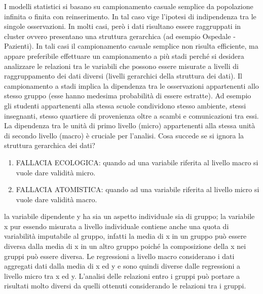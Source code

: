 \documentclass[a4page, 11pt]{article}
\begin{document}
I modelli statistici si basano su campionamento casuale semplice da popolazione infinita o finita con reinserimento. In tal caso vige l’ipotesi di indipendenza tra le singole osservazioni.
\newline 
In molti casi, però i dati risultano essere raggruppati in cluster ovvero presentano una struttura gerarchica (ad esempio Ospedale - Pazienti). In tali casi il campionamento casuale semplice non risulta efficiente, ma appare preferibile effettuare un campionamento a più stadi perché si desidera analizzare le relazioni tra le variabili che possono essere misurate a livelli di raggruppamento dei dati diversi (livelli gerarchici della struttura dei dati).
\newline
Il campionamento a stadi implica la dipendenza tra le osservazioni appartenenti allo stesso gruppo (esse hanno medesima probabilità di essere estratte).
\newline
Ad esempio gli studenti appartenenti alla stessa scuole condividono stesso ambiente, stessi insegnanti, stesso quartiere di provenienza oltre a scambi e comunicazioni tra essi.
\newline
La dipendenza tra le unità di primo livello (micro) appartenenti alla stessa unità di secondo livello (macro) è cruciale per l’analisi.
\newline
\newline
Cosa succede se si ignora la struttura gerarchica dei dati?
\begin{enumerate}[noitemsep]
\item FALLACIA ECOLOGICA: quando ad una variabile riferita al livello macro si vuole dare validità micro.
\item FALLACIA ATOMISTICA: quando ad una variabile riferita al livello micro si vuole dare validità macro.
\end{enumerate}
la variabile dipendente y ha sia un aspetto individuale sia di gruppo; la variabile x pur essendo misurata a livello individuale contiene anche una quota di variabilità imputabile al gruppo, infatti la media di x in un gruppo può essere diversa dalla media di x in un altro gruppo poiché la composizione della x nei gruppi può essere diversa.
\newline
Le regressioni a livello macro considerano i dati aggregati dati dalla media di x ed y e sono quindi diverse dalle regressioni a livello micro tra x ed y.
\newline
L’analisi delle relazioni entro i gruppi può portare a risultati molto diversi da quelli ottenuti considerando le relazioni tra i gruppi.
\end{document}
